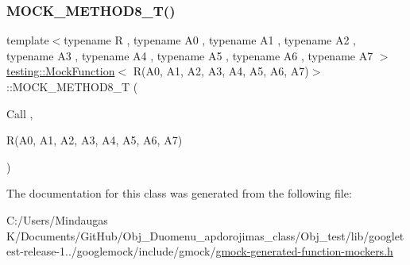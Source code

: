 \mbox{\label{classtesting_1_1_mock_function_3_01_r_07_a0_00_01_a1_00_01_a2_00_01_a3_00_01_a4_00_01_a5_00_01_a6_00_01_a7_08_4_a895c470e00e07294ab42c09588ae1e4c}} 
\subsubsection{\texorpdfstring{MOCK\_METHOD8\_T()}{MOCK\_METHOD8\_T()}}
{\footnotesize\ttfamily template$<$typename R , typename A0 , typename A1 , typename A2 , typename A3 , typename A4 , typename A5 , typename A6 , typename A7 $>$ \\
\mbox{\hyperlink{classtesting_1_1_mock_function}{testing\+::\+Mock\+Function}}$<$ R(A0, A1, A2, A3, A4, A5, A6, A7)$>$\+::M\+O\+C\+K\+\_\+\+M\+E\+T\+H\+O\+D8\+\_\+T (\begin{DoxyParamCaption}\item[{Call}]{,  }\item[{R(A0, A1, A2, A3, A4, A5, A6, A7)}]{ }\end{DoxyParamCaption})}



The documentation for this class was generated from the following file\+:\begin{DoxyCompactItemize}
\item 
C\+:/\+Users/\+Mindaugas K/\+Documents/\+Git\+Hub/\+Obj\+\_\+\+Duomenu\+\_\+apdorojimas\+\_\+class/\+Obj\+\_\+test/lib/googletest-\/release-\/1../googlemock/include/gmock/\mbox{\hyperlink{_obj__test_2lib_2googletest-release-1_88_81_2googlemock_2include_2gmock_2gmock-generated-function-mockers_8h}{gmock-\/generated-\/function-\/mockers.\+h}}\end{DoxyCompactItemize}
